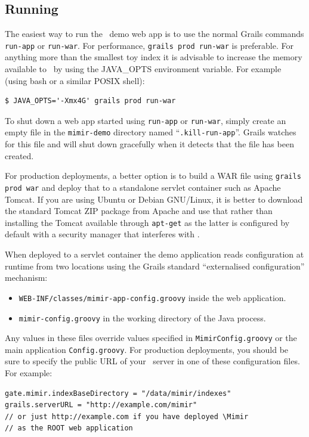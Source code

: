 \subsection{Running}

The easiest way to run the \Mimir\ demo web app is to use the normal Grails
commands {\tt run-app} or {\tt run-war}.  For performance, {\tt grails prod
run-war} is preferable.  For anything more than the smallest toy index it is
advisable to increase the memory available to \Mimir\ by using the JAVA\_OPTS
environment variable.  For example (using bash or a similar POSIX shell):
\begin{verbatim}
$ JAVA_OPTS='-Xmx4G' grails prod run-war
\end{verbatim}

To shut down a web app started using {\tt run-app} or {\tt run-war}, simply
create an empty file in the {\tt mimir-demo} directory named
``{\tt .kill-run-app}''.  Grails watches for this file and will shut down
gracefully when it detects that the file has been created.

For production deployments, a better option is to build a WAR file using
{\tt grails prod war} and deploy that to a standalone servlet container such as
Apache Tomcat.  If you are using Ubuntu or Debian GNU/Linux, it is better to
download the standard Tomcat ZIP package from Apache and use that rather than
installing the Tomcat available through {\tt apt-get} as the latter is
configured by default with a security manager that interferes with \Mimir.

When deployed to a servlet container the demo application reads configuration
at runtime from two locations using the Grails standard ``externalised
configuration'' mechanism:
\begin{itemize}
\item {\tt WEB-INF/classes/mimir-app-config.groovy} inside the web application.
\item {\tt mimir-config.groovy} in the working directory of the Java process.
\end{itemize}

Any values in these files override values specified in {\tt MimirConfig.groovy}
or the main application {\tt Config.groovy}.  For production deployments, you
should be sure to specify the public URL of your \Mimir\ server in one of these
configuration files.  For example:
\begin{lstlisting}[texcl]
gate.mimir.indexBaseDirectory = "/data/mimir/indexes"
grails.serverURL = "http://example.com/mimir"
// or just http://example.com if you have deployed \Mimir
// as the ROOT web application
\end{lstlisting}

